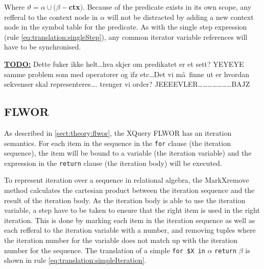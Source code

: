 Where $\vartheta = \alpha \cup (\beta -$\textbf{ctx}$)$. Because of the predicate exists in its own scope, any
refferal to the context node in $\alpha$ will not be distracted by adding a new context node in the symbol table
for the predicate. As with the single step expression (rule \ref{eq:translation:singleStep}), any common iterator
variable references will have to be synchronised.

\textbf{\underline{\Large TODO:}} Dette fuker ikke helt\ldots hva skjer om predikatet er et sett? YEYEYE samme
problem som med operatorer og ifz etc\ldots Det vi m\aa~finne ut er hvordan sekvenser skal representeres\ldots.
trenger vi order? JEEEEVLER\ldots\ldots\ldots\ldots\ldots\ldots\ldots  BAJZ


\subsection{FLWOR}
\label{sect:translation:mXr:iteration}
As described in \ref{sect:theory:flwor}, the XQuery FLWOR has an iteration semantics. For each item in the
sequence in the \texttt{for} clause (the iteration sequence), the item will be bound to a variable (the iteration
variable) and the expression in the \texttt{return} clause (the iteration body) will be executed.

To represent iteration over a sequence in relational algebra, the MarkXremove method calculates the cartesian
product between the iteration sequence and the result of the iteration body. As the iteration body is able to use
the iteration variable, a step have to be taken to ensure that the right item is used in the right iteration. This
is done by marking each item in the iteration sequence as well as each refferal to the iteration variable with a
number, and removing tuples where the iteration number for the variable does not match up with the iteration
number for the sequence. The translation of a simple \texttt{for \$X in} $\alpha$ \texttt{return} $\beta$ is shown
in rule \ref{eq:translation:simpleIteration}.

